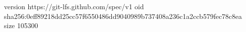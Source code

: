 version https://git-lfs.github.com/spec/v1
oid sha256:0eff89218dd25cc57f6550486dd9040989b737408a236c1a2ccb579fec78c8ea
size 105300

